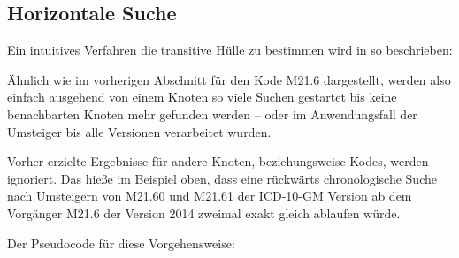 \subsection{Horizontale Suche}

Ein intuitives Verfahren die transitive Hülle zu bestimmen wird in \cite[Seite 200]{jakobsson1991mixed} so beschrieben:

\begin{figure}[H]
    \centering
    \setlength{\fboxsep}{10pt}\color{black!20}
    \normalcolor%
    \vspace{-1em}
\end{figure}

Ähnlich wie im vorherigen Abschnitt für den Kode M21.6 dargestellt, werden also einfach ausgehend von einem Knoten so viele Suchen gestartet bis keine benachbarten Knoten mehr gefunden werden -- oder im Anwendungsfall der Umsteiger bis alle Versionen verarbeitet wurden.

Vorher erzielte Ergebnisse für andere Knoten, beziehungsweise Kodes, werden ignoriert. Das hieße im Beispiel oben, dass eine rückwärts chronologische Suche nach Umsteigern von M21.60 und M21.61 der ICD-10-GM Version ab dem Vorgänger M21.6 der Version 2014 zweimal exakt gleich ablaufen würde. 

Der Pseudocode für diese Vorgehensweise:

